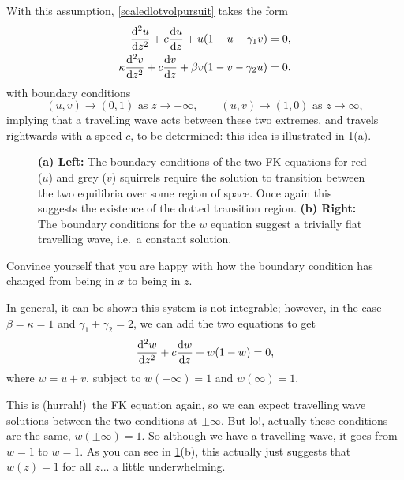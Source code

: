 \documentclass[main.tex]{subfiles}
\begin{document}
With this assumption, \cref{scaledlotvolpursuit} takes the form
\begin{subequations}
\begin{align}
\fdd{u}{z}+c\fd{u}{z} + u(1 - u - \gamma_1v) &= 0,\\
\kappa\fdd{v}{z}+c\fd{v}{z} + \beta v(1 - v -\gamma_2u) &= 0.\label{fk-grey-squirrel}
\end{align}
\end{subequations}
with boundary conditions
\begin{equation}
	(u,v)\to(0,1)\text{ as }z\to-\infty, \qquad (u,v)\to(1,0)\text{ as }z\to\infty,
\end{equation}
implying that a travelling wave acts between these two extremes, and travels rightwards with a speed $c$, to be determined: this idea is illustrated in \cref{fig:fk-travelling-wave-intuition-2}(a).
\begin{figure}
\centering

\quad

\caption{\textbf{(a) Left:} The boundary conditions of the two FK equations for red ($u$) and grey ($v$) squirrels require the solution to transition between the two equilibria over some region of space. Once again this suggests the existence of the dotted transition region. \textbf{(b) Right:} The boundary conditions for the $w$ equation suggest a trivially flat travelling wave, i.e.\ a constant solution.}
\label{fig:fk-travelling-wave-intuition-2}
\end{figure}

\begin{do-it-yourself}
Convince yourself that you are happy with how the boundary condition has changed from being in $x$ to being in $z$.
\end{do-it-yourself}

In general, it can be shown this system is not integrable; however, in the case $\beta = \kappa = 1$ and $\gamma_1+\gamma_2 = 2$, we can add the two equations to get
\begin{equation}
\fdd{w}{z} + c\fd{w}{z} + w(1-w)=0,
\end{equation}
where $w = u+v$, subject to $w(-\infty)=1$ and $w(\infty)=1$.

This is (hurrah!)\ the FK equation again, so we can expect travelling wave solutions between the two conditions at $\pm\infty$. But lo!, actually these conditions are the same, $w(\pm\infty)=1$. So although we have a travelling wave, it goes from $w=1$ to $w=1$. As you can see in \cref{fig:fk-travelling-wave-intuition-2}(b), this actually just suggests that $w(z)=1$ for all $z$... a little underwhelming. 
\end{document}
